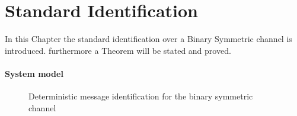 \chapter{Standard Identification}
In this Chapter the standard identification over a Binary Symmetric channel is introduced. furthermore a Theorem will be stated and proved.
\label{Standard.Identification}
\subsubsection{System model}
\begin{figure}[!htb]
    \centering
	
	\caption{Deterministic message identification for the binary symmetric channel}
	\label{Fig.BSC_Channel}
\end{figure}

